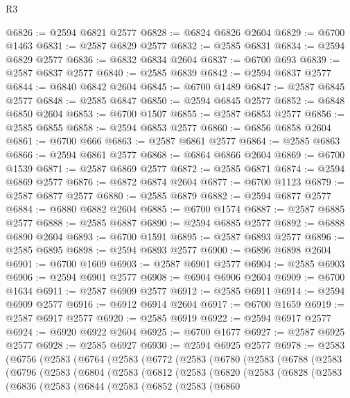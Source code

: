 \begin{lexlean}{R3}
\begin{coremodule}
@6826 := @2594 @6821 @2577
@6828 := @6824 @6826 @2604
@6829 := @6700 @1463
@6831 := @2587 @6829 @2577
@6832 := @2585 @6831
@6834 := @2594 @6829 @2577
@6836 := @6832 @6834 @2604
@6837 := @6700 @693
@6839 := @2587 @6837 @2577
@6840 := @2585 @6839
@6842 := @2594 @6837 @2577
@6844 := @6840 @6842 @2604
@6845 := @6700 @1489
@6847 := @2587 @6845 @2577
@6848 := @2585 @6847
@6850 := @2594 @6845 @2577
@6852 := @6848 @6850 @2604
@6853 := @6700 @1507
@6855 := @2587 @6853 @2577
@6856 := @2585 @6855
@6858 := @2594 @6853 @2577
@6860 := @6856 @6858 @2604
@6861 := @6700 @666
@6863 := @2587 @6861 @2577
@6864 := @2585 @6863
@6866 := @2594 @6861 @2577
@6868 := @6864 @6866 @2604
@6869 := @6700 @1539
@6871 := @2587 @6869 @2577
@6872 := @2585 @6871
@6874 := @2594 @6869 @2577
@6876 := @6872 @6874 @2604
@6877 := @6700 @1123
@6879 := @2587 @6877 @2577
@6880 := @2585 @6879
@6882 := @2594 @6877 @2577
@6884 := @6880 @6882 @2604
@6885 := @6700 @1574
@6887 := @2587 @6885 @2577
@6888 := @2585 @6887
@6890 := @2594 @6885 @2577
@6892 := @6888 @6890 @2604
@6893 := @6700 @1591
@6895 := @2587 @6893 @2577
@6896 := @2585 @6895
@6898 := @2594 @6893 @2577
@6900 := @6896 @6898 @2604
@6901 := @6700 @1609
@6903 := @2587 @6901 @2577
@6904 := @2585 @6903
@6906 := @2594 @6901 @2577
@6908 := @6904 @6906 @2604
@6909 := @6700 @1634
@6911 := @2587 @6909 @2577
@6912 := @2585 @6911
@6914 := @2594 @6909 @2577
@6916 := @6912 @6914 @2604
@6917 := @6700 @1659
@6919 := @2587 @6917 @2577
@6920 := @2585 @6919
@6922 := @2594 @6917 @2577
@6924 := @6920 @6922 @2604
@6925 := @6700 @1677
@6927 := @2587 @6925 @2577
@6928 := @2585 @6927
@6930 := @2594 @6925 @2577
@6978 := @2583
    (@6756
      (@2583
        (@6764
          (@2583
            (@6772
              (@2583
                (@6780
                  (@2583
                    (@6788
                      (@2583
                        (@6796
                          (@2583
                            (@6804
                              (@2583
                                (@6812
                                  (@2583
                                    (@6820
                                      (@2583
                                        (@6828
                                          (@2583
                                            (@6836
                                              (@2583
                                                (@6844
                                                  (@2583
                                                    (@6852
                                                      (@2583
                                                        (@6860

\end{coremodule}
\end{lexlean}
